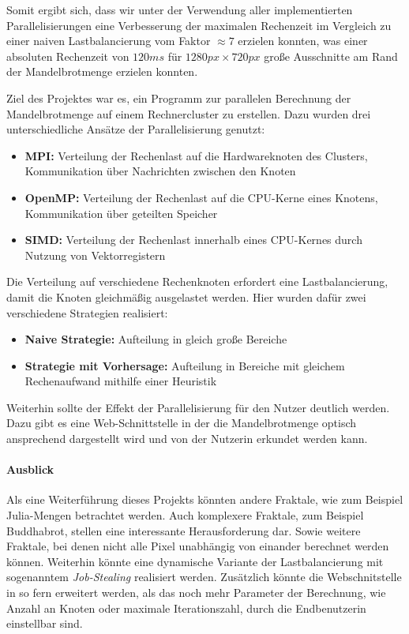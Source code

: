 Somit ergibt sich, dass wir unter der Verwendung aller implementierten Parallelisierungen eine Verbesserung
der maximalen Rechenzeit im Vergleich zu einer naiven Lastbalancierung vom Faktor \( \approx 7 \) erzielen konnten,
was einer absoluten Rechenzeit von \( 120ms \) für \( 1280px \times 720px \) große Ausschnitte am Rand der Mandelbrotmenge erzielen konnten.

\pagebreak
Ziel des Projektes war es, ein Programm zur parallelen Berechnung der Mandelbrotmenge auf einem Rechnercluster zu erstellen.
Dazu wurden drei unterschiedliche Ansätze der Parallelisierung genutzt:
\begin{itemize}
	\item \textbf{MPI:} Verteilung der Rechenlast auf die Hardwareknoten des Clusters, Kommunikation über Nachrichten zwischen den Knoten
	\item \textbf{OpenMP:} Verteilung der Rechenlast auf die CPU-Kerne eines Knotens, Kommunikation über geteilten Speicher
	\item \textbf{SIMD:} Verteilung der Rechenlast innerhalb eines CPU-Kernes durch Nutzung von Vektorregistern
\end{itemize}

Die Verteilung auf verschiedene Rechenknoten erfordert eine Lastbalancierung, damit die Knoten gleichmäßig ausgelastet werden.
Hier wurden dafür zwei verschiedene Strategien realisiert:
\begin{itemize}
	\item \textbf{Naive Strategie:} Aufteilung in gleich große Bereiche
	\item \textbf{Strategie mit Vorhersage:} Aufteilung in Bereiche mit gleichem Rechenaufwand mithilfe einer Heuristik
\end{itemize}

Weiterhin sollte der Effekt der Parallelisierung für den Nutzer deutlich werden.
Dazu gibt es eine Web-Schnittstelle in der die Mandelbrotmenge optisch ansprechend dargestellt wird und von der Nutzerin erkundet werden kann.

\paragraph{Ausblick}
Als eine Weiterführung dieses Projekts könnten andere Fraktale,
wie zum Beispiel Julia-Mengen betrachtet werden.
Auch komplexere Fraktale, zum Beispiel Buddhabrot, stellen eine interessante Herausforderung dar. Sowie weitere Fraktale,
bei denen nicht alle Pixel unabhängig von einander berechnet werden können.
Weiterhin könnte eine dynamische Variante der Lastbalancierung mit sogenanntem \textit{Job-Stealing} realisiert werden.
Zusätzlich könnte die Webschnitstelle in so fern erweitert werden, als das noch mehr
Parameter der Berechnung, wie Anzahl an Knoten oder maximale Iterationszahl, durch die Endbenutzerin einstellbar sind.